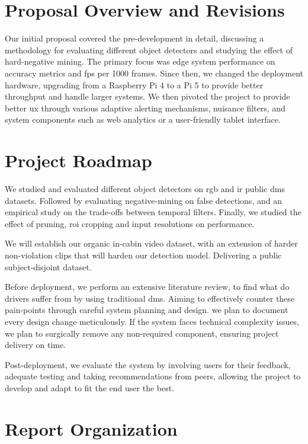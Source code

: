 \section{Proposal Overview and Revisions}

Our initial proposal covered the pre-development in detail, discussing a methodology for evaluating different object detectors and studying the effect of hard-negative mining. The primary focus was edge system performance on accuracy metrics and \glspl{fp} per 1000 frames. Since then, we changed the deployment hardware, upgrading from a Raspberry Pi 4 to a Pi 5 to provide better throughput and handle larger systems. We then pivoted the project to provide better \gls{ux} through various adaptive alerting mechanisms, nuisance filters, and system components such as web analytics or a user-friendly tablet interface.

\section{Project Roadmap}

We studied and evaluated different object detectors on \gls{rgb} and \gls{ir} public \gls{dms} datasets. Followed by evaluating negative-mining on false detections, and an empirical study on the trade-offs between temporal filters. Finally, we studied the effect of pruning, \gls{roi} cropping and input resolutions on performance. 

We will establish our organic in-cabin video dataset, with an extension of harder non-violation clips that will harden our detection model. Delivering a public subject-disjoint dataset. 

Before deployment, we perform an extensive literature review, to find what do drivers suffer from by using traditional \gls{dms}. Aiming to effectively counter these pain-points through careful system planning and design. we plan to document every design change meticulously. If the system faces technical complexity issues, we plan to surgically remove any non-required component, ensuring project delivery on time.

Post-deployment, we evaluate the system by involving users for their feedback, adequate testing and taking recommendations from peers, allowing the project to develop and adapt to fit the end user the best.

\section{Report Organization}


